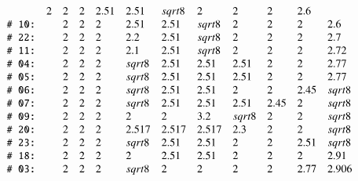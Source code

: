 \begin{tarskidata}
\begin{tarski}
\begin{lemma}
$$\begin{array}{llllllllllll}
   &2 &2 &2 &  2.51& 2.51 &\sqrt8&  2 & 2 & 2 & 2.6\\
%
 \rr{10}&\tuid{MYWEFEM}\tlabel{tarski:E:part4:2}
   &2 &2 &2 &2.51 & 2.51  &\sqrt{8}&   2 & 2 & 2 &  2.6\\
%
 \rr{22}&\tuid{JBUAAWJ} \tlabel{tarski:rem2.7}
     &2 &2 &2 &2.2& 2.51 &\sqrt{8}& 2 & 2 & 2 & 2.7\\
%
 \rr{11}&\tuid{EVWERXQ}\tlabel{tarski:E:part4:3}
   &2 &2 &2 &2.1& 2.51  &\sqrt{8}&   2 & 2 & 2 &  2.72\\
%
 \rr{04}&\tuid{HYEOHXS}\tlabel{tarski:enclosed-v}
   &2 &2 &2 &\sqrt{8}& 2.51 &2.51& 2.51 & 2 & 2 &  2.77\\
%
 \rr{05}&\tuid{MCWJKBZ}\tlabel{tarski:277}
   &2 &2 &2 &\sqrt{8}& 2.51 &2.51& 2.51 & 2 & 2 & 2.77\\
%
 \rr{06}&\tuid{TVORNRR}\tlabel{tarski:245}
   &2 &2 &2 &\sqrt{8}& 2.51 &2.51& 2 & 2 & 2.45 & \sqrt{8}\\
%
 \rr{07}&\tuid{AMVZLGB}\tlabel{tarski:245bis}
   &2 &2 &2 &\sqrt{8}& 2.51 &2.51& 2.51 & 2.45 & 2 & \sqrt{8}\\
%
 \rr{09}&\tuid{UREAOFU}\tlabel{tarski:E:part4:1}
   &2 &2 &2 &  2& 2 &3.2&   \sqrt{8} & 2 & 2 &  \sqrt{8}\\
%
 \rr{20}&\tuid{TADGJXO}\tlabel{tarski:convex-quad}
   &2 &2 &2 &   2.517& 2.517 &2.517&  2.3 & 2 & 2 &  \sqrt8\\
%
 \rr{23}&\tuid{NNPXALF} \tlabel{tarski:pass-anchor}%
     &2&2&2&\sqrt8 &2.51 &2.51 &2 &2 &2.51&\sqrt8\\
%
 \rr{18}&\tuid{GCRJNIH}\tlabel{tarski:E:part4:10}
   &2 &2 &2 &  2& 2.51 &2.51&   2 & 2 & 2 &  2.91\\
%
 \rr{03}&\tuid{DIKGYMO}\tlabel{tarski:dcg-p89}
   &2 &2 &2 &\sqrt8& 2 &2& 2 & 2 & 2.77 &2.906\\
\end{array}$$
\end{lemma}

\begin{proved}
\swallowed\end{proved}
\end{tarski}


 






\begin{tarski}


\end{tarski}
\end{tarskidata}
